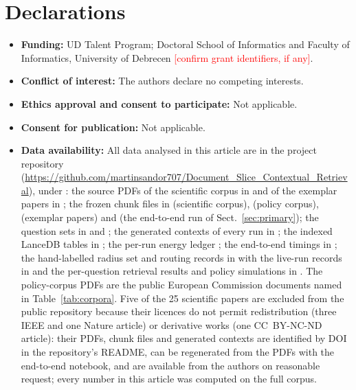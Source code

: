 \documentclass[pdflatex,sn-mathphys-num]{sn-jnl}
\newcommand{\todo}[1]{\textcolor{red}{#1}}
\theoremstyle{thmstyleone}%
\theoremstyle{thmstylethree}%
\begin{document}
\section{Declarations}

\begin{itemize}
\item \textbf{Funding:} UD Talent Program; Doctoral School of Informatics and Faculty of Informatics, University of Debrecen \todo{[confirm grant identifiers, if any]}.
\item \textbf{Conflict of interest:} The authors declare no competing interests.
\item \textbf{Ethics approval and consent to participate:} Not applicable.
\item \textbf{Consent for publication:} Not applicable.
\item \textbf{Data availability:} All data analysed in this article are in the project repository (\url{https://github.com/martinsandor707/Document_Slice_Contextual_Retrieval}), under : the source PDFs of the scientific corpus in  and of the exemplar papers in ; the frozen chunk files in  (scientific corpus),  (policy corpus),  (exemplar papers) and  (the end-to-end run of Sect.~\ref{sec:primary}); the question sets in  and ; the generated contexts of every run in ; the indexed LanceDB tables in ; the per-run energy ledger ; the end-to-end timings in ; the hand-labelled radius set and routing records in  with the live-run records in  and the per-question retrieval results and policy simulations in . The policy-corpus PDFs are the public European Commission documents named in Table~\ref{tab:corpora}. Five of the 25 scientific papers are excluded from the public repository because their licences do not permit redistribution (three IEEE and one Nature article) or derivative works (one CC~BY-NC-ND article): their PDFs, chunk files and generated contexts are identified by DOI in the repository's README, can be regenerated from the PDFs with the end-to-end notebook, and are available from the authors on reasonable request; every number in this article was computed on the full corpus.

\end{itemize}
\end{document}
